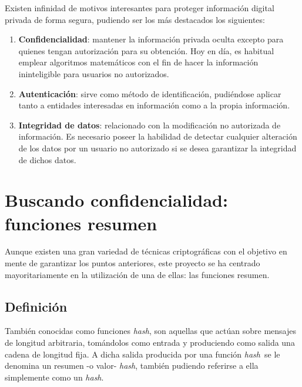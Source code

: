 \documentclass[12pt,spanish,listoffigures,listoftables]{tfgetsinf}
\newcommand{\hash}{\textit{hash}}
\begin{document}
Existen infinidad de motivos interesantes para proteger información digital privada de forma segura, pudiendo ser los más destacados los siguientes:

\begin{enumerate}
	
	\item \textbf{Confidencialidad}: mantener la información privada oculta excepto para quienes tengan autorización para su obtención. Hoy en día, es habitual emplear algoritmos matemáticos con el fin de hacer la información ininteligible para usuarios no autorizados.
	
	\item \textbf{Autenticación}: sirve como método de identificación, pudiéndose aplicar tanto a entidades interesadas en información como a la propia información.

	\item \textbf{Integridad de datos}: relacionado con la modificación no autorizada de información. Es necesario poseer la habilidad de detectar cualquier alteración de los datos por un usuario no autorizado si se desea garantizar la integridad de dichos datos.

\end{enumerate}

\section{Buscando confidencialidad: funciones resumen}

Aunque existen una gran variedad de técnicas criptográficas con el objetivo en mente de garantizar los puntos anteriores, este proyecto se ha centrado mayoritariamente en la utilización de una de ellas: las funciones resumen.

\subsection{Definición}

También conocidas como funciones \hash, son aquellas que actúan sobre mensajes de longitud arbitraria, tomándolos como entrada y produciendo como salida una cadena de longitud fija. A dicha salida producida por una función \hash~se le denomina un resumen -o valor- \hash, también pudiendo referirse a ella simplemente como un \hash.
\end{document}
